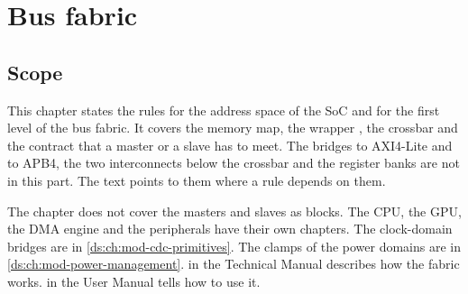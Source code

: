 \chapter{Bus fabric}\label{ds:ch:mod-bus-fabric}

\section{Scope}\label{ds:ch:mod-bus-fabric:scope}
This chapter states the rules for the address space of the SoC and for the first level of the bus fabric. It covers the memory map, the wrapper , the crossbar  and the contract that a master or a slave has to meet. The bridges to AXI4-Lite and to APB4, the two interconnects below the crossbar and the register banks are not in this part. The text points to them where a rule depends on them.

The chapter does not cover the masters and slaves as blocks. The CPU, the GPU, the DMA engine and the peripherals have their own chapters. The clock-domain bridges are in \cref{ds:ch:mod-cdc-primitives}. The clamps of the power domains are in \cref{ds:ch:mod-power-management}.  in the Technical Manual describes how the fabric works.  in the User Manual tells how to use it.

